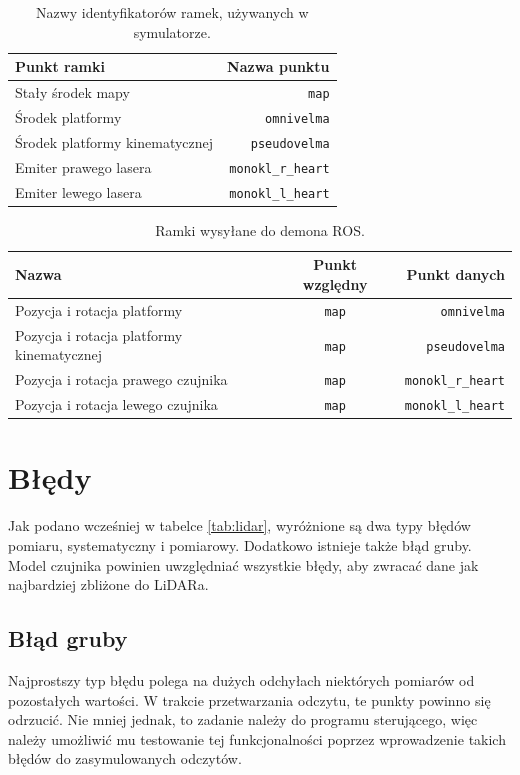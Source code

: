 		\begin{table}
			\centering
			\begin{tabular}{l r}
				Punkt ramki & Nazwa punktu \\
				\hline
				Stały środek mapy & \texttt{map} \\
				Środek platformy & \texttt{omnivelma} \\
				Środek platformy kinematycznej & \texttt{pseudovelma} \\
				Emiter prawego lasera & \texttt{monokl\_r\_heart} \\
				Emiter lewego lasera & \texttt{monokl\_l\_heart} \\
			\end{tabular}
			\caption{Nazwy identyfikatorów ramek, używanych w symulatorze.}
			\label{tab:frames}
		\end{table}
			
		\begin{table}
			\centering
			\begin{tabular}{l c r}
				Nazwa & Punkt względny & Punkt danych \\
				\hline
				Pozycja i rotacja platformy & \texttt{map} & \texttt{omnivelma} \\
				Pozycja i rotacja platformy kinematycznej & \texttt{map} & \texttt{pseudovelma} \\
				Pozycja i rotacja prawego czujnika & \texttt{map} & \texttt{monokl\_r\_heart} \\
				Pozycja i rotacja lewego czujnika & \texttt{map} & \texttt{monokl\_l\_heart} \\
			\end{tabular}
			\caption{Ramki wysyłane do demona ROS.}
			\label{tab:frame_send}
		\end{table}

\section{Błędy}
	Jak podano wcześniej w tabelce \ref{tab:lidar}, wyróżnione są dwa typy błędów pomiaru, systematyczny i pomiarowy.
	Dodatkowo istnieje także błąd gruby.
	Model czujnika powinien uwzględniać wszystkie błędy, aby zwracać dane jak najbardziej zbliżone do LiDARa.

	\subsection{Błąd gruby}
		Najprostszy typ błędu polega na dużych odchyłach niektórych pomiarów od pozostałych wartości.
		W trakcie przetwarzania odczytu, te punkty powinno się odrzucić.
		Nie mniej jednak, to zadanie należy do programu sterującego, więc należy umożliwić mu testowanie tej funkcjonalności poprzez wprowadzenie takich błędów do zasymulowanych odczytów.

